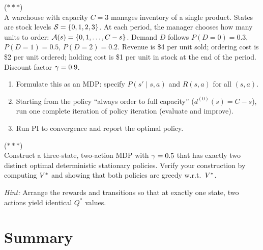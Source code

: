\documentclass[11pt,a4paper]{article}
\begin{document}
\begin{exercise}
\textnormal{(\(***\))} \\
A warehouse with capacity $C = 3$ manages inventory of a single
product. States are stock levels $\mathcal{S} = \{0, 1, 2, 3\}$. At
each period, the manager chooses how many units to order:
$\mathcal{A}(s) = \{0, 1, \ldots, C - s\}$. Demand $D$ follows
$P(D=0) = 0.3$, $P(D=1) = 0.5$, $P(D=2) = 0.2$. Revenue is
\$4 per unit sold; ordering cost is \$2 per unit ordered; holding
cost is \$1 per unit in stock at the end of the period.
Discount factor $\gamma = 0.9$.
\begin{enumerate}[label=(\alph*)]
    \item Formulate this as an MDP: specify $P(s' \mid s,a)$ and
    $R(s,a)$ for all $(s,a)$.
    \item Starting from the policy ``always order to full capacity''
    ($d^{(0)}(s) = C - s$), run one complete iteration of policy
    iteration (evaluate and improve).
    \item Run PI to convergence and report the optimal policy.
\end{enumerate}
\end{exercise}

\begin{exercise}
\textnormal{(\(***\))} \\
Construct a three-state, two-action MDP with $\gamma = 0.5$ that
has exactly two distinct optimal deterministic stationary policies.
Verify your construction by computing $V^*$ and showing that both
policies are greedy w.r.t.\ $V^*$.

\textit{Hint:} Arrange the rewards and transitions so that at
exactly one state, two actions yield identical $Q^*$ values.
\end{exercise}


\section{Summary}
\label{sec:summary}
\end{document}
